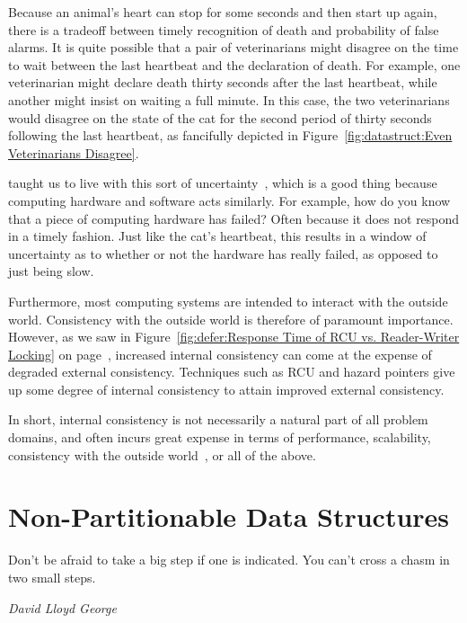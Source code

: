 Because an animal's heart can stop for some seconds and then start up
again, there is a tradeoff between timely recognition of death and
probability of false alarms.
It is quite possible that a pair of veterinarians might disagree on
the time to wait between the last heartbeat and the declaration of
death.
For example, one veterinarian might declare death thirty seconds after
the last heartbeat, while another might insist on waiting a full
minute.
In this case, the two veterinarians would disagree on the state of the
cat for the second period of thirty seconds following the last heartbeat,
as fancifully depicted in
Figure~\ref{fig:datastruct:Even Veterinarians Disagree}.

 taught us to live with this sort of
uncertainty~\cite{WeinerHeisenberg1927Uncertain}, which is a good
thing because computing hardware and software acts similarly.
For example, how do you know that a piece of computing hardware
has failed?
Often because it does not respond in a timely fashion.
Just like the cat's heartbeat, this results in a window of
uncertainty as to whether or not the hardware has really failed,
as opposed to just being slow.

Furthermore, most computing systems are intended to interact with
the outside world.
Consistency with the outside world is therefore of paramount importance.
However, as we saw in
Figure~\ref{fig:defer:Response Time of RCU vs. Reader-Writer Locking}
on
page~\pageref{fig:defer:Response Time of RCU vs. Reader-Writer Locking},
increased internal consistency can come at the expense of degraded
external consistency.
Techniques such as RCU and hazard pointers give up some degree of
internal consistency to attain improved external consistency.

In short, internal consistency is not necessarily a natural part of all
problem domains, and often incurs great expense in terms of performance,
scalability, consistency with the outside
world~\cite{AndreasHaas2012FIFOisnt,AndreasHaas2013CFRelaxedQueues,10.5555/3241639.3241645},
or all of the above.

\section{Non-Partitionable Data Structures}
\label{sec:datastruct:Non-Partitionable Data Structures}
%
\epigraph{Don't be afraid to take a big step if one is indicated.
	  You can't cross a chasm in two small steps.}
	 {\emph{David Lloyd George}}


